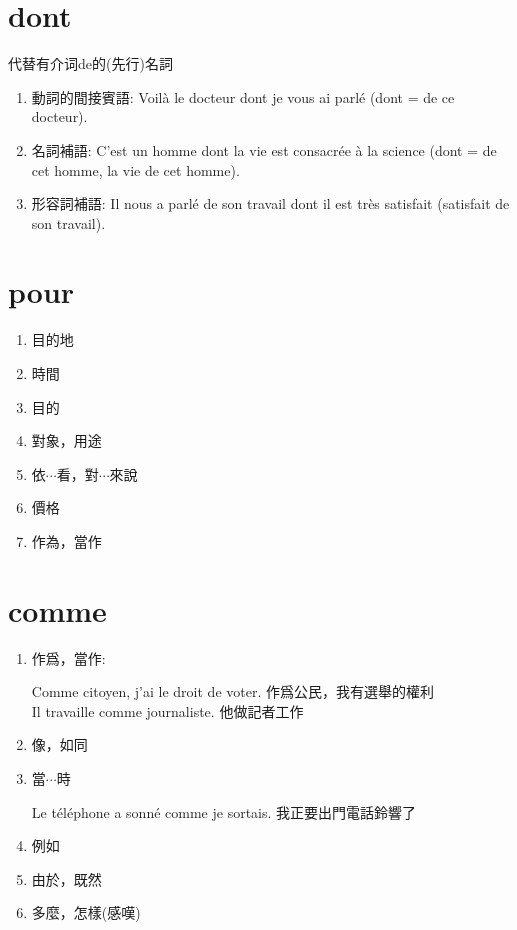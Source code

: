 \documentclass{book}
\begin{document}
    \section{dont}
        代替有介词de的(先行)名詞
        \begin{enumerate}
            \item 動詞的間接賓語: Voilà le docteur dont je vous ai parlé (dont = de ce docteur).
            \item 名詞補語: C'est un homme dont la vie est consacrée à la science (dont = de cet homme, la vie de cet homme).
            \item 形容詞補語: Il nous a parlé de son travail dont il est très satisfait (satisfait de son travail).
        \end{enumerate}
    
    \section{pour}
        \begin{enumerate}
            \item 目的地
            \item 時間
            \item 目的
            \item 對象，用途
            \item 依$\cdots$看，對$\cdots$來說
            \item 價格
            \item 作為，當作
        \end{enumerate}

    \section{comme}
        \begin{enumerate}
            \item 作爲，當作: 
                \begin{center}
                    Comme citoyen, j'ai le droit de voter. 作爲公民，我有選舉的權利
                    \\
                    Il travaille comme journaliste. 他做記者工作
                \end{center}
            \item 像，如同
            \item 當$\cdots$時
                \begin{center}
                    Le téléphone a sonné comme je sortais. 我正要出門電話鈴響了
                \end{center}
            \item 例如
            \item 由於，既然
            \item 多麼，怎樣(感嘆)
        \end{enumerate}
\end{document}

